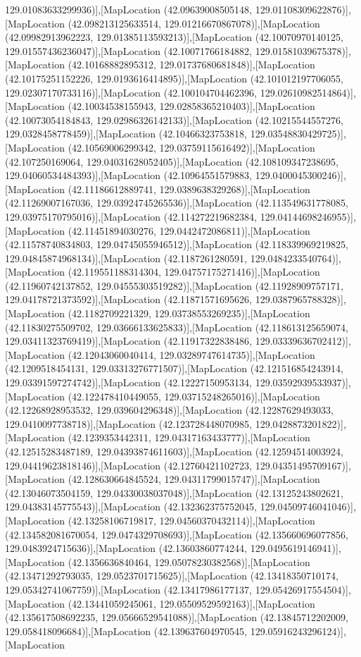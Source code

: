 129.01083633299936)],[MapLocation (42.09639008505148, 129.01108309622876)],[MapLocation (42.098213125633514, 129.01216670867078)],[MapLocation (42.09982913962223, 129.01385113593213)],[MapLocation (42.10070970140125, 129.01557436236047)],[MapLocation (42.10071766184882, 129.01581039675378)],[MapLocation (42.10168882895312, 129.01737680681848)],[MapLocation (42.10175251152226, 129.0193616414895)],[MapLocation (42.101012197706055, 129.02307170733116)],[MapLocation (42.100104704462396, 129.02610982514864)],[MapLocation (42.10034538155943, 129.02858365210403)],[MapLocation (42.10073054184843, 129.02986326142133)],[MapLocation (42.10215544557276, 129.0328458778459)],[MapLocation (42.10466323753818, 129.03548830429725)],[MapLocation (42.10569006299342, 129.03759115616492)],[MapLocation (42.107250169064, 129.04031628052405)],[MapLocation (42.108109347238695, 129.04060534484393)],[MapLocation (42.10964551579883, 129.0400045300246)],[MapLocation (42.11186612889741, 129.0389638329268)],[MapLocation (42.11269007167036, 129.03924745265536)],[MapLocation (42.113549631778085, 129.03975170795016)],[MapLocation (42.114272219682384, 129.04144698246955)],[MapLocation (42.11451894030276, 129.0442472086811)],[MapLocation (42.11578740834803, 129.04745055946512)],[MapLocation (42.118339969219825, 129.04845874968134)],[MapLocation (42.1187261280591, 129.0484233540764)],[MapLocation (42.119551188314304, 129.04757175271416)],[MapLocation (42.11960742137852, 129.04555303519282)],[MapLocation (42.11928909757171, 129.04178721373592)],[MapLocation (42.11871571695626, 129.0387965788328)],[MapLocation (42.1182709221329, 129.03738553269235)],[MapLocation (42.11830275509702, 129.03666133625833)],[MapLocation (42.118613125659074, 129.03411323769419)],[MapLocation (42.11917322838486, 129.03339636702412)],[MapLocation (42.12043060040414, 129.03289747614735)],[MapLocation (42.1209518454131, 129.03313276771507)],[MapLocation (42.121516854243914, 129.03391597274742)],[MapLocation (42.12227150953134, 129.03592939533937)],[MapLocation (42.122478410449055, 129.03715248265016)],[MapLocation (42.12268928953532, 129.039604296348)],[MapLocation (42.12287629493033, 129.0410097738718)],[MapLocation (42.123728448070985, 129.0428873201822)],[MapLocation (42.1239353442311, 129.04317163433777)],[MapLocation (42.12515283487189, 129.04393874611603)],[MapLocation (42.12594514003924, 129.04419623818146)],[MapLocation (42.12760421102723, 129.04351495709167)],[MapLocation (42.128630664845524, 129.04311799015747)],[MapLocation (42.13046073504159, 129.04330038037048)],[MapLocation (42.13125243802621, 129.04383145775543)],[MapLocation (42.132362375752045, 129.04509746041046)],[MapLocation (42.13258106719817, 129.04560370432114)],[MapLocation (42.134582081670054, 129.0474329708693)],[MapLocation (42.135660696077856, 129.0483924715636)],[MapLocation (42.13603860774244, 129.0495619146941)],[MapLocation (42.1356636840464, 129.05078230382568)],[MapLocation (42.13471292793035, 129.0523701715625)],[MapLocation (42.13418350710174, 129.05342741067759)],[MapLocation (42.13417986177137, 129.05426917554504)],[MapLocation (42.13441059245061, 129.05509529592163)],[MapLocation (42.135617508692235, 129.05666529541088)],[MapLocation (42.13845712202009, 129.058418096684)],[MapLocation (42.139637604970545, 129.05916243296124)],[MapLocation 